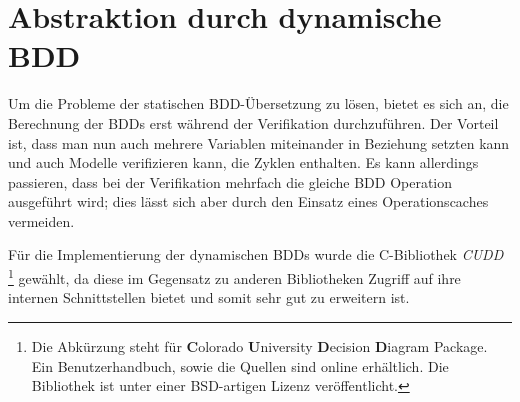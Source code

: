 \section{Abstraktion durch dynamische BDD}
Um die Probleme der statischen BDD-Übersetzung zu lösen, bietet es sich an, die Berechnung der BDDs erst während der Verifikation durchzuführen.
Der Vorteil ist, dass man nun auch mehrere Variablen miteinander in Beziehung setzten kann und auch Modelle verifizieren kann, die Zyklen enthalten.
Es kann allerdings passieren, dass bei der Verifikation mehrfach die gleiche BDD Operation ausgeführt wird; dies lässt sich aber durch den Einsatz eines Operationscaches vermeiden.

Für die Implementierung der dynamischen BDDs wurde die C-Bibliothek \emph{CUDD}
\footnote{Die Abkürzung steht für {\bf C}olorado {\bf U}niversity {\bf D}ecision {\bf D}iagram Package.
  Ein Benutzerhandbuch, sowie die Quellen sind online erhältlich\cite{cudd}.
  Die Bibliothek ist unter einer BSD-artigen Lizenz veröffentlicht.
}
gewählt, da diese im Gegensatz zu anderen Bibliotheken Zugriff auf ihre internen Schnittstellen bietet und somit sehr gut zu erweitern ist.